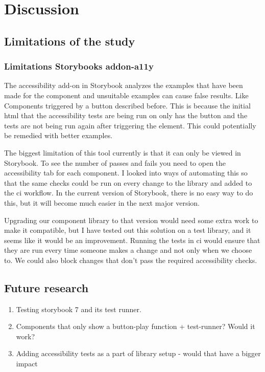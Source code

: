 \documentclass{master_thesis}
\begin{document}
\section{Discussion}

\subsection{Limitations of the study}
\subsubsection{Limitations Storybooks addon-a11y}

The accessibility add-on in Storybook analyzes the examples that have been made for the component and unsuitable examples can cause false results. Like Components triggered by a button described before. This is because the initial \ac{html} that the accessibility tests are being run on only has the button and the tests are not being run again after triggering the element. This could potentially be remedied with better examples.

The biggest limitation of this tool currently is that it can only be viewed in Storybook. To see the number of passes and fails you need to open the accessibility tab for each component. I looked into ways of automating this so that the same checks could be run on every change to the library and added to the \ac{ci} workflow. In the current version of Storybook, there is no easy way to do this, but it will become much easier in the next major version.

Upgrading our component library to that version would need some extra work to make it compatible, but I have tested out this solution on a test library, and it seems like it would be an improvement. Running the tests in \ac{ci} would ensure that they are run every time someone makes a change and not only when we choose to. We could also block changes that don't pass the required accessibility checks.


\subsection{Future research}

\begin{enumerate}
	\item Testing storybook 7 and its test runner.
	\item Components that only show a button-play function + test-runner? Would it work?
	\item Adding accessibility tests as a part of library setup - would that have a bigger impact
\end{enumerate}

\end{document}

